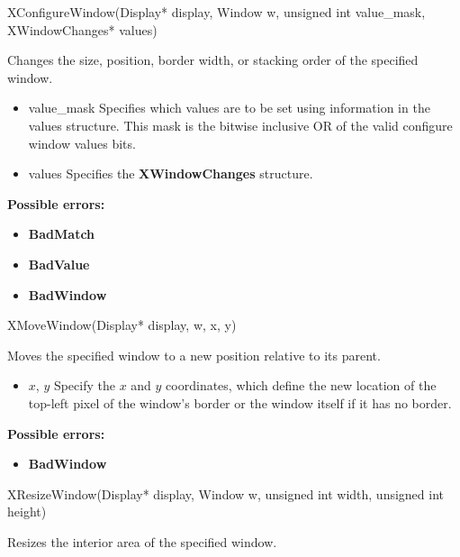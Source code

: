 \documentclass{report}
\begin{document}
\begin{itemize}
            \begin{cppcode}
                XConfigureWindow(Display* display, Window w, unsigned int value_mask, XWindowChanges* values)
            \end{cppcode}
            \bigbreak \noindent
            Changes the size, position, border width, or stacking order of the specified window.
            \begin{itemize}
                \item value\_mask Specifies which values are to be set using information in the values structure. This mask is the bitwise inclusive OR of the valid configure window values bits.
                \item values Specifies the \textbf{XWindowChanges} structure.
            \end{itemize}

            \bigbreak \noindent
            \textbf{Possible errors:}
            \begin{itemize}
                \item \textbf{BadMatch}
                \item \textbf{BadValue}
                \item \textbf{BadWindow}
            \end{itemize}

            \begin{cppcode}
                XMoveWindow(Display* display, w, x, y)
            \end{cppcode}
            \bigbreak \noindent
            Moves the specified window to a new position relative to its parent.

            \begin{itemize}
                \item $x$, $y$ Specify the $x$ and $y$ coordinates, which define the new location of the top-left pixel of the window’s border or the window itself if it has no border.
            \end{itemize}

            \bigbreak \noindent
            \textbf{Possible errors:}
            \begin{itemize}
                \item \textbf{BadWindow}
            \end{itemize}

            \begin{cppcode}
                XResizeWindow(Display* display, Window w, unsigned int width, unsigned int height)
            \end{cppcode}
            \bigbreak \noindent
            Resizes the interior area of the specified window.


\end{itemize}
\end{document}
